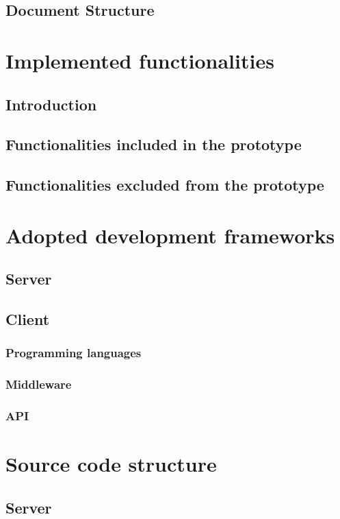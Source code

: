     \section{Document Structure}
    	
    
\newpage
\chapter{Implemented functionalities}
    \section{Introduction}
    \section{Functionalities included in the prototype}
    \section{Functionalities excluded from the prototype}
    
\newpage
\chapter{Adopted development frameworks}
    \section{Server}
    	
    \section{Client}
	    \subsection{Programming languages}
	    \subsection{Middleware}
	    \subsection{API}

\newpage
\chapter{Source code structure}
	\section{Server}
		

